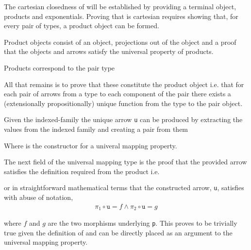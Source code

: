 
The cartesian closedness of  will be established by
providing a terminal object, products and exponentials.  Proving that
 is cartesian requires showing that, for every pair of
types, a product object can be formed.


Product objects consist of an object, projections out of the object and a proof
that the objects and arrows satisfy the universal property of products.

Products correspond to the pair type




All that remains is to prove that these constitute the product object i.e. that
for each pair of arrows from a type to each component of the pair there exists a
(extensionally propositionally) unique function from the type to the pair object.


Given the indexed-family the unique arrow \verb|u| can be produced by extracting
the values from the indexed family and creating a pair from them


Where  is the constructor for a univeral mapping property.

The next field of the universal mapping type is the proof that the provided
arrow satisfies the definition required from the product i.e.


or in straightforward mathematical terms that the constructed arrow, \verb|u|,
satisfies with abuse of notation,
\begin{align*}
    \pi_{1} \circ \texttt{u} = f \land \pi_{2} \circ \texttt{u} = g
\end{align*}

where $f$ and $g$ are the two morphisms underlying \verb|p|. This proves to be
trivially true given the definition of  and can be
directly placed as an argument to the universal mapping property.

